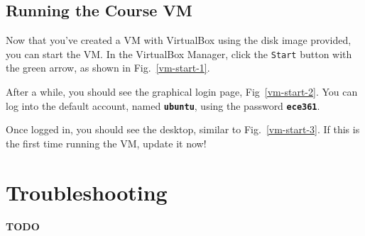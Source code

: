 \documentclass[11pt]{article}
\begin{document}
\subsection{Running the Course VM}
\label{subsec:run-vm}
Now that you've created a VM with VirtualBox using the disk image provided, you can start the VM. In the VirtualBox Manager, click the \texttt{Start} button with the green arrow, as shown in Fig.~\ref{vm-start-1}.

After a while, you should see the graphical login page, Fig~\ref{vm-start-2}. You can log into the default account, named \textbf{\texttt{ubuntu}}, using the password \textbf{\texttt{ece361}}.

Once logged in, you should see the desktop, similar to Fig.~\ref{vm-start-3}. If this is the first time running the VM, update it now!


\section{Troubleshooting}
\label{sec:troubleshooting}
\textbf{TODO}
\end{document}
